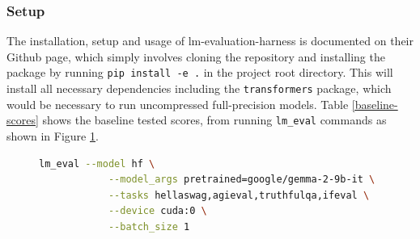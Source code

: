\documentclass{ifacconf}
\begin{document}
	\subsubsection{Setup}
	The installation, setup and usage of lm-evaluation-harness is documented on their Github page, which simply involves cloning the repository and installing the package by running \verb|pip install -e .| in the project root directory. This will install all necessary dependencies including the \verb|transformers| package, which would be necessary to run uncompressed full-precision models. Table \ref{baseline-scores} shows the baseline tested scores, from running \verb|lm_eval| commands as shown in Figure \ref{lm-eval-command}.
	
	\begin{figure}[H]
		\centering
		\begin{lstlisting}[language=bash,numbers=none]
			lm_eval --model hf \
			--model_args pretrained=google/gemma-2-9b-it \
			--tasks hellaswag,agieval,truthfulqa,ifeval \
			--device cuda:0 \
			--batch_size 1
		\end{lstlisting}
		\label{lm-eval-command}
	\end{figure}
	
\end{document}
